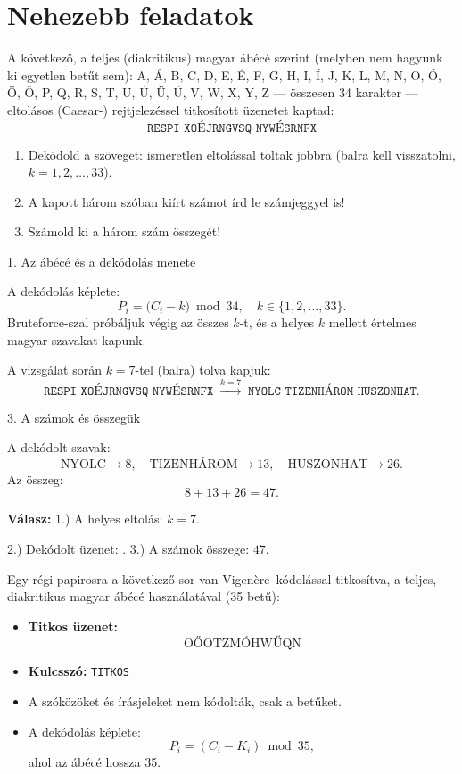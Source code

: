 \section*{Nehezebb feladatok}
\begin{extraproblem}
A következő, a teljes (diakritikus) magyar ábécé szerint (melyben
nem hagyunk ki egyetlen betűt sem): A, Á, B, C, D, E, É, F, G, H,
I, Í, J, K, L, M, N, O, Ó, Ö, Ő, P, Q, R, S, T, U, Ú, Ü, Ű, V, W,
X, Y, Z --- összesen 34 karakter --- eltolásos (Caesar-) rejtjelezéssel
titkosított üzenetet kaptad: 
\[
\texttt{RESPI XOÉJRNGVSQ NYWÉSRNFX}
\]
\begin{enumerate}
\item Dekódold a szöveget: ismeretlen eltolással toltak jobbra (balra kell
visszatolni, $k=1,2,\dots,33$). 
\item A kapott három szóban kiírt számot írd le számjeggyel is! 
\item Számold ki a három szám összegét! 
\end{enumerate}
\end{extraproblem}

\begin{solution}
1. Az ábécé és a dekódolás menete

A dekódolás képlete: 
\[
P_{i}=\bigl(C_{i}-k\bigr)\bmod34,\quad k\in\{1,2,\dots,33\}.
\]
Bruteforce-szal próbáljuk végig az összes $k$-t, és a helyes $k$
mellett értelmes magyar szavakat kapunk.

A vizsgálat során $k=7$-tel (balra) tolva kapjuk: 
\[
\texttt{RESPI XOÉJRNGVSQ NYWÉSRNFX}\;\xrightarrow{k=7}\;\texttt{NYOLC TIZENHÁROM HUSZONHAT}.
\]

3. A számok és összegük

A dekódolt szavak: 
\[
\text{NYOLC}\to8,\quad\text{TIZENHÁROM}\to13,\quad\text{HUSZONHAT}\to26.
\]
Az összeg: 
\[
8+13+26=47.
\]

\bigskip{}
\textbf{Válasz:} 1.) A helyes eltolás: $k=7$. 

2.) Dekódolt üzenet: . 3.) A számok
összege: ${\displaystyle 47}$. 
\end{solution}
\begin{extraproblem}
Egy régi papirosra a következő sor van Vigenère--kódolással titkosítva,
a teljes, diakritikus magyar ábécé használatával (35 betű):
\begin{itemize}
\item \textbf{Titkos üzenet:} 
\[
\text{OŐOTZMÓHWŰQN}
\]
\item \textbf{Kulcsszó:} \texttt{TITKOS} 
\item A szóközöket és írásjeleket nem kódolták, csak a betűket. 
\item A dekódolás képlete: 
\[
P_{i}=(C_{i}-K_{i})\bmod35,
\]
ahol az ábécé hossza 35. 
\end{itemize}
\end{extraproblem}

